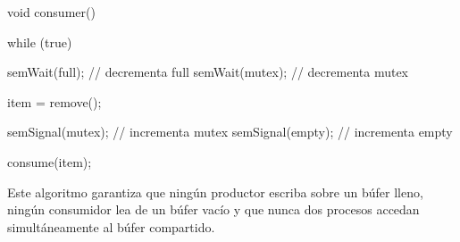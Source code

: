\begin{ccode}[title=Implementación del consumidor]
void consumer() {
  while (true) {
    semWait(full); // decrementa full
    semWait(mutex); // decrementa mutex

    item = remove();

    semSignal(mutex); // incrementa mutex
    semSignal(empty); // incrementa empty

    consume(item);
  }
}
\end{ccode}

Este algoritmo garantiza que ningún productor escriba sobre un búfer lleno, ningún consumidor lea de un búfer vacío y que nunca dos procesos accedan simultáneamente al búfer compartido.
